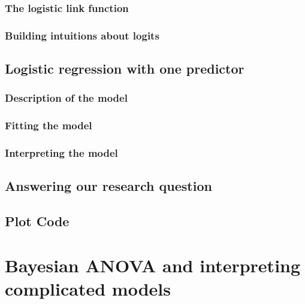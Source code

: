 \documentclass[
]{book}
\begin{document}
\hypertarget{the-logistic-link-function}{%
\subsection{The logistic link function}\label{the-logistic-link-function}}

\hypertarget{building-intuitions-about-logits}{%
\subsection{Building intuitions about logits}\label{building-intuitions-about-logits}}

\hypertarget{logistic-regression-with-one-predictor}{%
\section{Logistic regression with one predictor}\label{logistic-regression-with-one-predictor}}

\hypertarget{description-of-the-model-9}{%
\subsection{Description of the model}\label{description-of-the-model-9}}

\hypertarget{fitting-the-model-8}{%
\subsection{Fitting the model}\label{fitting-the-model-8}}

\hypertarget{interpreting-the-model-6}{%
\subsection{Interpreting the model}\label{interpreting-the-model-6}}

\hypertarget{answering-our-research-question}{%
\section{Answering our research question}\label{answering-our-research-question}}

\hypertarget{plot-code-6}{%
\section{Plot Code}\label{plot-code-6}}

\hypertarget{bayesian-anova-and-interpreting-complicated-models}{%
\chapter{Bayesian ANOVA and interpreting complicated models}\label{bayesian-anova-and-interpreting-complicated-models}}
\end{document}
